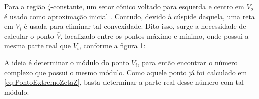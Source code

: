 Para a região $\zeta$-constante, um setor cônico voltado para esquerda e centro em $V_o$ é usado como aproximação inicial \cite{WISNIEWSKI2019}. Contudo, devido à cúspide daquela, uma reta em $V_i$ é usada para eliminar tal convexidade. Dito isso, surge a necessidade de calcular o ponto $\bar{V}$, localizado entre os pontos máximo e mínimo, onde possui a mesma parte real que $V_i$, conforme a figura \ref{subfig:AproximacaoPoligonalZeta1}:

A ideia é determinar o módulo do ponto $V_i$, para então encontrar o número complexo que possui o mesmo módulo. Como aquele ponto já foi calculado em \eqref{eq:PontoExtremoZetaZ}, basta determinar a parte real desse número com tal módulo:

\begin{figure}[!hb]
  \centering
  \begin{subfigure}[t]{0.4\columnwidth}
      
      \caption{}
      \label{subfig:AproximacaoPoligonalZeta1}
  \end{subfigure}
  \begin{subfigure}[t]{0.4\columnwidth}
      
      \caption{}
      \label{subfig:AproximacaoPoligonalZeta2}
  \end{subfigure}
  \\
  \begin{subfigure}[t]{0.4\columnwidth}
    
    \caption{}
    \label{subfig:AproximacaoPoligonalZeta3}
  \end{subfigure}
  \begin{subfigure}[t]{0.4\columnwidth}
    
    \caption{}
    \label{subfig:AproximacaoPoligonalZeta4}
  \end{subfigure}
  \caption{}
  \label{fig:AproximacoesPoligonalZeta}
\end{figure}

